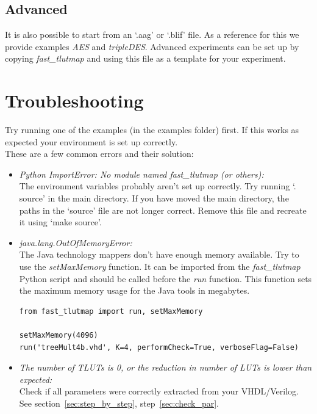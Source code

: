\documentclass[a4paper,oneside]{memoir}
\begin{document}
\section{Advanced}
It is also possible to start from an `.aag' or `.blif' file. As a reference for this we provide examples \emph{AES} and \emph{tripleDES}. 
Advanced experiments can be set up by copying \emph{fast\_tlutmap} and using this file as a template for your experiment.

\clearpage
\chapter{Troubleshooting}\label{sec:troubleshooting}
Try running one of the examples (in the examples folder) first. If this works as expected your environment is set up correctly.\\

These are a few common errors and their solution:
\begin{itemize}
\item \emph{Python ImportError: No module named fast\_tlutmap (or others):}\\
The environment variables probably aren't set up correctly. Try running `. source' in the main directory. 
If you have moved the main directory, the paths in the `source' file are not longer correct. Remove this file and recreate it using `make source'.

\item \emph{java.lang.OutOfMemoryError:}\\
The Java technology mappers don't have enough memory available. Try to use the \emph{setMaxMemory} function. It can be imported from the \emph{fast\_tlutmap} Python script and should be called before the \emph{run} function. This function sets the maximum memory usage for the Java tools in megabytes.
\lstset{language=python}
\begin{lstlisting}
from fast_tlutmap import run, setMaxMemory

setMaxMemory(4096)
run('treeMult4b.vhd', K=4, performCheck=True, verboseFlag=False)
\end{lstlisting}

\item \emph{The number of TLUTs is 0, or the reduction in number of LUTs is lower than expected:}\\
Check if all parameters were correctly extracted from your VHDL/Verilog. See section~\ref{sec:step_by_step}, step~\ref{sec:check_par}.
\end{itemize}
\end{document}
